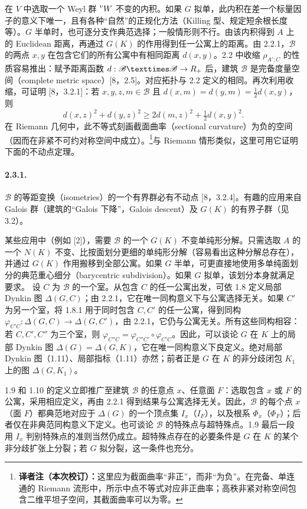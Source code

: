在 $V$ 中选取一个 Weyl 群 $\prescript{v}{}{W}$ 不变的内积。如果 $G$ 拟单，此内积在差一个标量因子的意义下唯一，且有各种“自然”的正规化方法（Killing 型、规定短余根长度等）。$G$ 半单时，也可逐分支作典范选择；一般情形则不行。由该内积得到 $A$ 上的 Euclidean 距离，再通过 $G(K)$ 的作用得到任一公寓上的距离。由 2.2.1，$\mathscr B$ 的两点 $x,y$ 在包含它们的所有公寓中有相同距离 $d(x,y)$。2.2 中收缩 $\rho_{A';C}$ 的性质容易推出：赋予距离函数 $d:\mathscr B\times\mathscr B\to\R_+$ 后，建筑 $\mathscr B$ 是完备度量空间（complete metric space）[8，2.5]。对应拓扑与 2.2 定义的相同。再次利用收缩，可证明 [8，3.2.1]：若 $x,y,z,m\in\mathscr B$ 且 $d(x,m)=d(y,m)=\frac12d(x,y)$，则
\[
d(x,z)^2+d(y,z)^2\geq2d(m,z)^2+\tfrac12d(x,y)^2.
\]
在 Riemann 几何中，此不等式刻画截面曲率（sectional curvature）为负的空间（因而在非紧不可约对称空间中成立）。\footnote{\textbf{译者注（本次校订）：}这里应为截面曲率“非正”，而非“为负”。在完备、单连通的 Riemann 流形中，所示中点不等式对应非正曲率；高秩非紧对称空间包含二维平坦子空间，其截面曲率可以为零。}与 Riemann 情形类似，这里可用它证明下面的不动点定理。

\paragraph*{2.3.1.}$\mathscr B$ 的等距变换（isometries）的一个有界群必有不动点 [8，3.2.4]。有趣的应用来自 Galois 群（建筑的“Galois 下降”，Galois descent）及 $G(K)$ 的有界子群（见 3.2）。

某些应用中（例如 [2]），需要 $\mathscr B$ 的一个 $G(K)$ 不变单纯形分解。只需选取 $A$ 的一个 $N(K)$ 不变、比按面划分更细的单纯形分解（容易看出这种分解总存在），并通过 $G(K)$ 作用搬移到全部公寓。如果 $G$ 半单，可更直接地使用多单纯面划分的典范重心细分（barycentric subdivision）。如果 $G$ 拟单，该划分本身就满足要求。
设 $C$ 为 $\mathscr B$ 的一个室。从包含 $C$ 的任一公寓出发，可依 1.8 定义局部 Dynkin 图 $\Delta(G,C)$；由 2.2.1，它在唯一同构意义下与公寓选择无关。如果 $C'$ 为另一个室，将 1.8.1 用于同时包含 $C,C'$ 的任一公寓，得到同构 $\varphi_{C'C}:\Delta(G,C)\to\Delta(G,C')$，由 2.2.1，它仍与公寓无关。所有这些同构相容：若 $C,C',C''$ 为三个室，则 $\varphi_{C''C}=\varphi_{C''C'}\circ\varphi_{C'C}$。因此，可以谈论 $G$ 在 $K$ 上的局部 Dynkin 图 $\Delta(G)=\Delta(G,K)$，它在唯一同构意义下良定义。绝对局部 Dynkin 图（1.11）、局部指标（1.11）亦然；前者正是 $G$ 在 $K$ 的非分歧闭包 $K_1$ 上的图 $\Delta(G,K_1)$。

1.9 和 1.10 的定义立即推广至建筑 $\mathscr B$ 的任意点 $x$、任意面 $F$：选取包含 $x$ 或 $F$ 的公寓，采用相应定义，再由 2.2.1 得到结果与公寓选择无关。因此，$\mathscr B$ 的每个点 $x$（面 $F$）都典范地对应于 $\Delta(G)$ 的一个顶点集 $I_x$（$I_F$），以及根系 $\Phi_x$（$\Phi_F$）；后者仅在非典范同构意义下定义。也可谈论 $\mathscr B$ 的特殊点与超特殊点。1.9 最后一段用 $I_x$ 判别特殊点的准则当然仍成立。超特殊点存在的必要条件是 $G$ 在 $K$ 的某个非分歧扩张上分裂；若 $G$ 拟分裂，这一条件也充分。

